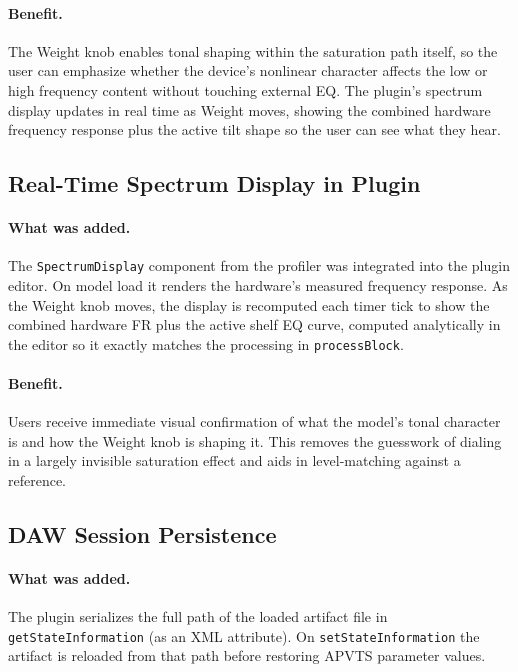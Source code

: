 \documentclass[11pt, letterpaper]{article}
\begin{document}
\paragraph{Benefit.}
The Weight knob enables tonal shaping within the saturation path itself, so the
user can emphasize whether the device's nonlinear character affects the low or
high frequency content without touching external EQ.  The plugin's spectrum
display updates in real time as Weight moves, showing the combined hardware
frequency response plus the active tilt shape so the user can see what they
hear.

\subsection{Real-Time Spectrum Display in Plugin}

\paragraph{What was added.}
The \texttt{SpectrumDisplay} component from the profiler was integrated into
the plugin editor.  On model load it renders the hardware's measured frequency
response.  As the Weight knob moves, the display is recomputed each timer tick
to show the combined hardware FR plus the active shelf EQ curve, computed
analytically in the editor so it exactly matches the processing in
\texttt{processBlock}.

\paragraph{Benefit.}
Users receive immediate visual confirmation of what the model's tonal character
is and how the Weight knob is shaping it.  This removes the guesswork of
dialing in a largely invisible saturation effect and aids in level-matching
against a reference.

\subsection{DAW Session Persistence}

\paragraph{What was added.}
The plugin serializes the full path of the loaded artifact file in
\texttt{getStateInformation} (as an XML attribute).  On
\texttt{setStateInformation} the artifact is reloaded from that path before
restoring APVTS parameter values.
\end{document}
